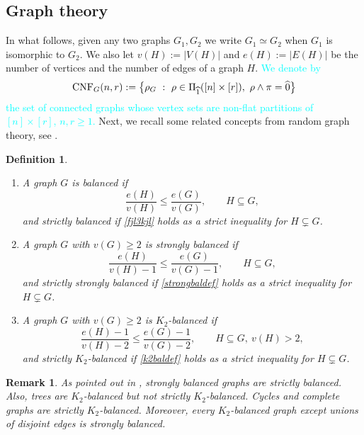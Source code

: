 \documentclass[12pt]{article}
\newtheorem{definition}[prop]{Definition}
\newtheorem{remark}[prop]{Remark}
\numberwithin{equation}{section}
\begin{document}
\subsection*{Graph theory}
\noindent
In what follows, given any two graphs $G_1,G_2$
we write $G_1\simeq G_2$ when $G_1$ is isomorphic to $G_2$. 
We also let $v(H):=|V(H)|$ and $e(H):=|E(H)|$ be the number of vertices and the number of edges of a graph $H$.
\textcolor{cyan}{We denote by 
$$
{\rm CNF}_G(n,r) :=\big\{ \rho_G \ : \ \rho\in\Pi_{\widehat{1}}( [n]\times [r]),
 \ 
 \rho\wedge\pi=\widehat{0}\big\}
$$
the set of connected graphs whose vertex sets are non-flat partitions of
 $[n]\times [r]$, $n, r\geq 1$.}
 Next, we recall some related concepts from random graph theory, see \cite{luczakrucinski92,JLR11}.  
\begin{definition} \cite[pages~64-65]{JLR11}\label{balgra}
  \begin{enumerate}[1)]
    \item
    A graph $G$ is balanced if 
    \begin{equation}
 \label{fjl3kjl} 
\frac{e(H)}{v(H)}\le\frac{e(G)}{v(G)},
\qquad H\subseteq G, 
  \end{equation}
 and strictly balanced if \eqref{fjl3kjl} 
 holds as a strict inequality for $H\subsetneq G$. 
\item 
 A graph $G$ with $v(G)\ge2$ is strongly balanced %
 if 
\begin{equation}\label{strongbaldef}
  \frac{e(H)}{v(H)-1}\le\frac{e(G)}{v(G)-1},
  \qquad
  H\subseteq G, 
\end{equation}
and strictly strongly balanced if
\eqref{strongbaldef} holds as a strict inequality for
 $H\subsetneq G$. 
 \item 
 A graph $G$ with $v(G)\ge2$ is $K_2$-balanced
 if 
\begin{equation}\label{k2baldef}
  \frac{e(H)-1}{v(H)-2}\le\frac{e(G)-1}{v(G)-2},
  \qquad
  H\subseteq G,~ v(H)>2,
\end{equation}
and strictly $K_2$-balanced if
\eqref{k2baldef} holds as a strict inequality for
 $H\subsetneq G$. 
\end{enumerate}
\end{definition}
\begin{remark}\label{graph-example}
 As pointed out in \cite{luczakrucinski92}, strongly balanced graphs are strictly balanced. Also, trees are $K_2$-balanced but not strictly $K_2$-balanced. Cycles and complete graphs are strictly $K_2$-balanced. Moreover, every $K_2$-balanced graph except unions of disjoint edges is strongly balanced.
\end{remark}  
\end{document}
